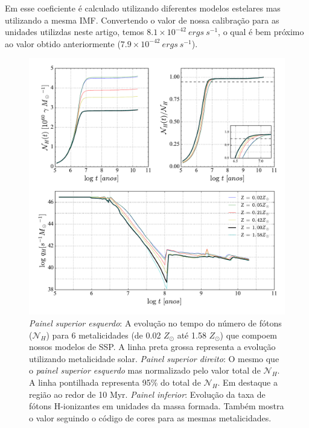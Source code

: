 Em \citet{Kennicutt.1998a} esse coeficiente é calculado utilizando diferentes modelos estelares mas
utilizando a mesma IMF. Convertendo o valor de nossa calibração para as unidades utilizdas neste
artigo, temos $8.1 \times 10^{-42}\ ergs\ s^{-1}$, o qual é bem próximo ao valor obtido
anteriormente ($7.9 \times 10^{-42}\ ergs\ s^{-1}$).

\begin{figure}
	\centering
	\includegraphics[scale=0.62]{figuras/Nh_logt_metBase_Padova2000_salp.pdf}
	\caption[Evolução temporal do número de fótons H-ionizantes e da taxa de fótons H-ionizantes em
unidades da massa formada.] 
	{\emph{Painel superior esquerdo}: A	evolução no tempo do número de fótons ($\mathcal{N}_H$) para 6
metalicidades (de 0.02 $Z_\odot$ até 1.58 $Z_\odot$) que compoem nossos modelos de SSP. A linha
preta grossa representa a evolução utilizando metalicidade solar. \emph{Painel superior direito}:
O mesmo que o \emph{painel superior esquerdo} mas normalizado pelo valor total de $\mathcal{N}_H$.
A linha pontilhada representa 95\% do total de $\mathcal{N}_H$. Em destaque a região ao redor de 10
Myr. \emph{Painel inferior}: Evolução da taxa de fótons H-ionizantes em unidades da massa formada.
Também mostra o valor seguindo o código de cores para as mesmas metalicidades.}
	\label{fig:Nh_qh}
\end{figure}
 
